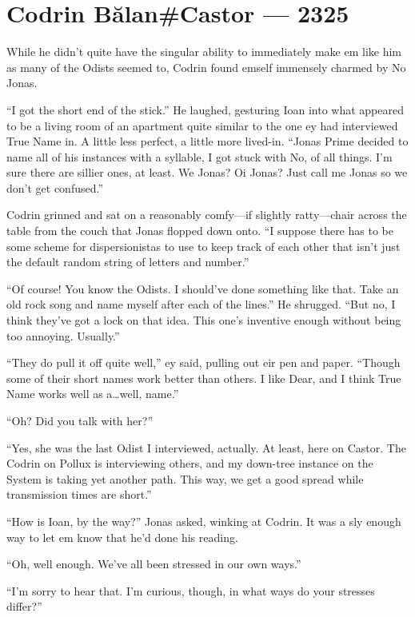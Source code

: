 \hypertarget{codrin-bux103lancastor-2325}{%
\chapter{Codrin Bălan\#Castor — 2325}\label{codrin-bux103lancastor-2325}}

While he didn't quite have the singular ability to immediately make em like him as many of the Odists seemed to, Codrin found emself immensely charmed by No Jonas.

``I got the short end of the stick.'' He laughed, gesturing Ioan into what appeared to be a living room of an apartment quite similar to the one ey had interviewed True Name in. A little less perfect, a little more lived-in. ``Jonas Prime decided to name all of his instances with a syllable, I got stuck with No, of all things. I'm sure there are sillier ones, at least. We Jonas? Oi Jonas? Just call me Jonas so we don't get confused.''

Codrin grinned and sat on a reasonably comfy---if slightly ratty---chair across the table from the couch that Jonas flopped down onto. ``I suppose there has to be some scheme for dispersionistas to use to keep track of each other that isn't just the default random string of letters and number.''

``Of course! You know the Odists. I should've done something like that. Take an old rock song and name myself after each of the lines.'' He shrugged. ``But no, I think they've got a lock on that idea. This one's inventive enough without being too annoying. Usually.''

``They do pull it off quite well,'' ey said, pulling out eir pen and paper. ``Though some of their short names work better than others. I like Dear, and I think True Name works well as a\ldots well, name.''

``Oh? Did you talk with her?''

``Yes, she was the last Odist I interviewed, actually. At least, here on Castor. The Codrin on Pollux is interviewing others, and my down-tree instance on the System is taking yet another path. This way, we get a good spread while transmission times are short.''

``How is Ioan, by the way?'' Jonas asked, winking at Codrin. It was a sly enough way to let em know that he'd done his reading.

``Oh, well enough. We've all been stressed in our own ways.''

``I'm sorry to hear that. I'm curious, though, in what ways do your stresses differ?''

